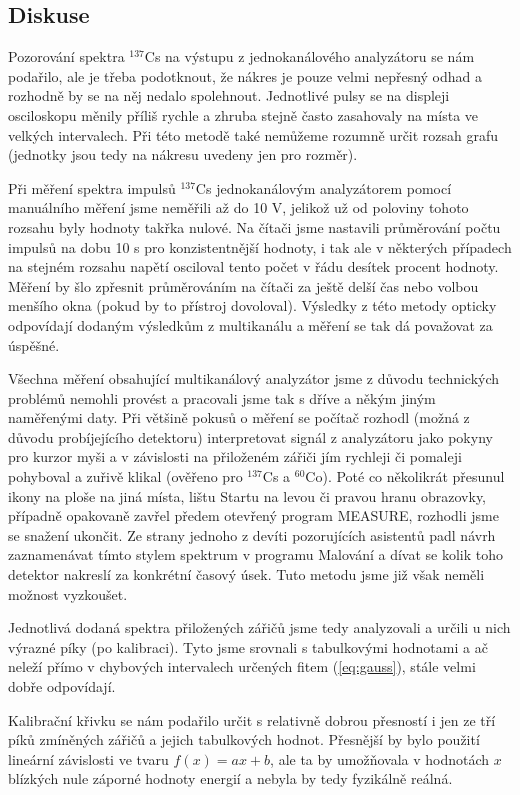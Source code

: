 \documentclass[english]{article}
\begin{document}
	\subsection{Diskuse}
					Pozorování spektra $^{137}$Cs na výstupu z jednokanálového analyzátoru se nám podařilo, ale je třeba podotknout, že nákres je pouze velmi nepřesný odhad a rozhodně by se na něj nedalo spolehnout. Jednotlivé pulsy se na displeji osciloskopu měnily příliš rychle a zhruba stejně často zasahovaly na místa ve velkých intervalech. Při této metodě také nemůžeme rozumně určit rozsah grafu (jednotky jsou tedy na nákresu uvedeny jen pro rozměr). 
					
					Při měření spektra impulsů $^{137}$Cs jednokanálovým analyzátorem pomocí manuálního měření jsme neměřili až do 10 V, jelikož už od poloviny tohoto rozsahu byly hodnoty takřka nulové. Na čítači jsme nastavili průměrování počtu impulsů na dobu 10 s pro konzistentnější hodnoty, i tak ale v některých případech na stejném rozsahu napětí osciloval tento počet v řádu desítek procent hodnoty. Měření by šlo zpřesnit průměrováním na čítači za ještě delší čas nebo volbou menšího okna (pokud by to přístroj dovoloval). Výsledky z této metody opticky odpovídají dodaným výsledkům z multikanálu a měření se tak dá považovat za úspěšné. 
					
					Všechna měření obsahující multikanálový analyzátor jsme z důvodu technických problémů nemohli provést a pracovali jsme tak s dříve a někým jiným naměřenými daty. Při většině pokusů o měření se počítač rozhodl (možná z důvodu probíjejícího detektoru) interpretovat signál z analyzátoru jako pokyny pro kurzor myši a v závislosti na přiloženém zářiči jím rychleji či pomaleji pohyboval a zuřivě klikal (ověřeno pro $^{137}$Cs a $^{60}$Co). Poté co několikrát přesunul ikony na ploše na jiná místa, lištu Startu na levou či pravou hranu obrazovky, případně opakovaně zavřel předem otevřený program MEASURE, rozhodli jsme se snažení ukončit. Ze strany jednoho z devíti pozorujících asistentů padl návrh zaznamenávat tímto stylem spektrum v programu Malování a dívat se kolik toho detektor nakreslí za konkrétní časový úsek. Tuto metodu jsme již však neměli možnost vyzkoušet. 
					
					Jednotlivá dodaná spektra přiložených zářičů jsme tedy analyzovali a určili u nich výrazné píky (po kalibraci). Tyto jsme srovnali s tabulkovými hodnotami a ač neleží přímo v chybových intervalech určených fitem (\ref{eq:gauss}), stále velmi dobře odpovídají. 
					
					Kalibrační křivku se nám podařilo určit s relativně dobrou přesností i jen ze tří píků zmíněných zářičů a jejich tabulkových \cite{bib:net} hodnot. Přesnější by bylo použití lineární závislosti ve tvaru $f(x) = ax+b$, ale ta by umožňovala v hodnotách $x$ blízkých nule záporné hodnoty energií a nebyla by tedy fyzikálně reálná. 
					
\end{document}
